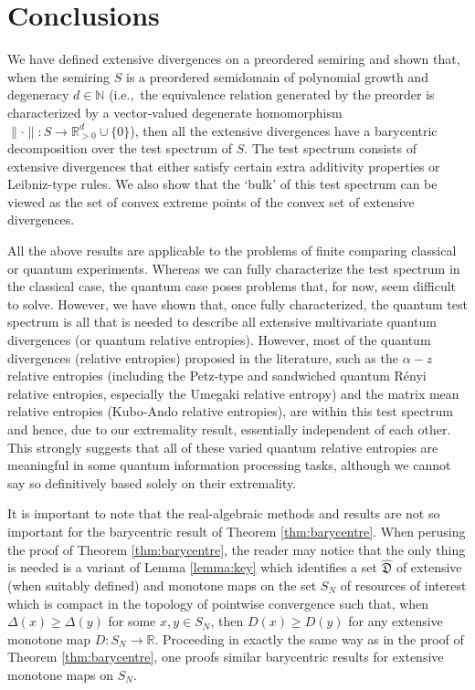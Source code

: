 \documentclass[12pt,a4paper,reqno]{amsart}
\theoremstyle{definition}
\newcommand{\mf}[1]{\mathfrak{#1}}
\newcommand{\N}{\mathbb N}
\newcommand{\R}{\mathbb R}
\begin{document}
\section{Conclusions}
We have defined extensive divergences on a preordered semiring and shown that, when the semiring $S$ is a preordered semidomain of polynomial growth and degeneracy $d\in\N$ (i.e.,\ the equivalence relation generated by the preorder is characterized by a vector-valued degenerate homomorphism $\|\cdot\|:S\to\R_{>0}^d\cup\{0\}$), then all the extensive divergences have a barycentric decomposition over the test spectrum of $S$. The test spectrum consists of extensive divergences that either satisfy certain extra additivity properties or Leibniz-type rules. We also show that the `bulk' of this test spectrum can be viewed as the set of convex extreme points of the convex set of extensive divergences.

All the above results are applicable to the problems of finite comparing classical or quantum experiments. Whereas we can fully characterize the test spectrum in the classical case, the quantum case poses problems that, for now, seem difficult to solve. However, we have shown that, once fully characterized, the quantum test spectrum is all that is needed to describe all extensive multivariate quantum divergences (or quantum relative entropies). However, most of the quantum divergences (relative entropies) proposed in the literature, such as the $\alpha-z$ relative entropies (including the Petz-type and sandwiched quantum R\'{e}nyi relative entropies, especially the Umegaki relative entropy) and the matrix mean relative entropies (Kubo-Ando relative entropies), are within this test spectrum and hence, due to our extremality result, essentially independent of each other. This strongly suggests that all of these varied quantum relative entropies are meaningful in some quantum information processing tasks, although we cannot say so definitively based solely on their extremality.

It is important to note that the real-algebraic methods and results are not so important for the barycentric result of Theorem \ref{thm:barycentre}. When perusing the proof of Theorem \ref{thm:barycentre}, the reader may notice that the only thing is needed is a variant of Lemma \ref{lemma:key} which identifies a set $\hat{\mf D}$ of extensive (when suitably defined) and monotone maps on the set $S_N$ of resources of interest which is compact in the topology of pointwise convergence such that, when $\Delta(x)\geq\Delta(y)$ for some $x,y\in S_N$, then $D(x)\geq D(y)$ for any extensive monotone map $D:S_N\to\R$. Proceeding in exactly the same way as in the proof of Theorem \ref{thm:barycentre}, one proofs similar barycentric results for extensive monotone maps on $S_N$.
\end{document}
